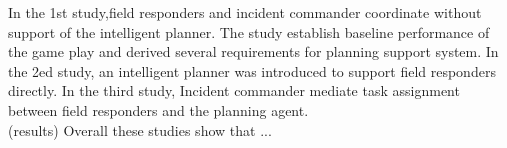 \noindent In the 1st study,field responders and incident commander coordinate without support of the intelligent planner. The study establish baseline performance of the game play and derived several requirements for planning support system. In the 2ed study, an intelligent planner was introduced to support field responders directly. In the third study, Incident commander mediate task assignment between field responders and the planning agent. \\

\noindent (results) Overall these studies show that ... 


\endgroup			

\vfill